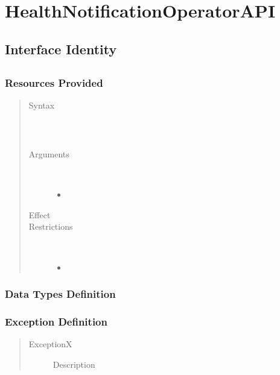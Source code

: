 \section{HealthNotificationOperatorAPI}

\subsection{Interface Identity}

\subsection{\method{}}

\subsubsection{Resources Provided}

\begin{quote}
	\begin{description}
		\item[Syntax] \
		\begin{verbatim}

		\end{verbatim}
		\item[Arguments] \
		\begin{itemize}
		  \item 
		\end{itemize}
		\item[Effect]
		\item[Restrictions] \
		\begin{itemize}
		  \item 
		\end{itemize}
	\end{description} 
\end{quote}

\subsubsection{Data Types Definition}

\begin{quote}
	\begin{description}
		\item[] 
	\end{description} 
\end{quote}

\subsubsection{Exception Definition} 

\begin{quote}
	\begin{description}
		\item[ExceptionX] Description
	\end{description} 
\end{quote}
